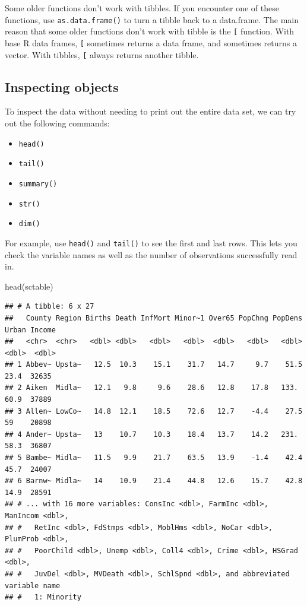 \documentclass[
]{book}
\newenvironment{Shaded}{\begin{snugshade}}{\end{snugshade}}
\newcommand{\FunctionTok}[1]{\textcolor[rgb]{0.00,0.00,0.00}{#1}}
\newcommand{\NormalTok}[1]{#1}
\providecommand{\tightlist}{%
  \setlength{\itemsep}{0pt}\setlength{\parskip}{0pt}}
\begin{document}
Some older functions don't work with tibbles. If you encounter one of these functions, use \texttt{as.data.frame()} to turn a tibble back to a data.frame. The main reason that some older functions don't work with tibble is the \texttt{{[}} function. With base R data frames, \texttt{{[}} sometimes returns a data frame, and sometimes returns a vector. With tibbles, \texttt{{[}} always returns another tibble.

\hypertarget{inspecting-objects}{%
\subsection*{Inspecting objects}\label{inspecting-objects}}

To inspect the data without needing to print out the entire data set, we can try out the following commands:

\begin{itemize}
\tightlist
\item
  \texttt{head()}
\item
  \texttt{tail()}
\item
  \texttt{summary()}
\item
  \texttt{str()}
\item
  \texttt{dim()}
\end{itemize}

For example, use \texttt{head()} and \texttt{tail()} to see the first and last rows. This lets you check the variable names as well as the number of observations successfully read in.

\begin{Shaded}
\begin{Highlighting}[]
\FunctionTok{head}\NormalTok{(sctable)}
\end{Highlighting}
\end{Shaded}

\begin{verbatim}
## # A tibble: 6 x 27
##   County Region Births Death InfMort Minor~1 Over65 PopChng PopDens Urban Income
##   <chr>  <chr>   <dbl> <dbl>   <dbl>   <dbl>  <dbl>   <dbl>   <dbl> <dbl>  <dbl>
## 1 Abbev~ Upsta~   12.5  10.3    15.1    31.7   14.7     9.7    51.5  23.4  32635
## 2 Aiken  Midla~   12.1   9.8     9.6    28.6   12.8    17.8   133.   60.9  37889
## 3 Allen~ LowCo~   14.8  12.1    18.5    72.6   12.7    -4.4    27.5  59    20898
## 4 Ander~ Upsta~   13    10.7    10.3    18.4   13.7    14.2   231.   58.3  36807
## 5 Bambe~ Midla~   11.5   9.9    21.7    63.5   13.9    -1.4    42.4  45.7  24007
## 6 Barnw~ Midla~   14    10.9    21.4    44.8   12.6    15.7    42.8  14.9  28591
## # ... with 16 more variables: ConsInc <dbl>, FarmInc <dbl>, ManIncom <dbl>,
## #   RetInc <dbl>, FdStmps <dbl>, MoblHms <dbl>, NoCar <dbl>, PlumProb <dbl>,
## #   PoorChild <dbl>, Unemp <dbl>, Coll4 <dbl>, Crime <dbl>, HSGrad <dbl>,
## #   JuvDel <dbl>, MVDeath <dbl>, SchlSpnd <dbl>, and abbreviated variable name
## #   1: Minority
\end{verbatim}
\end{document}
